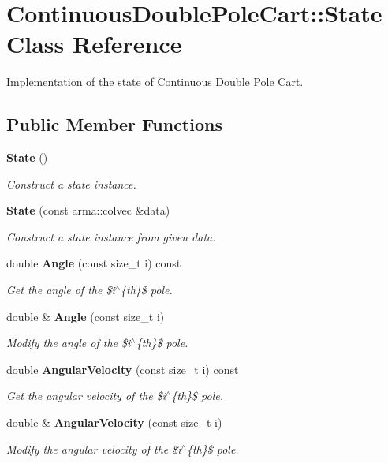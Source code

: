 \section{Continuous\+Double\+Pole\+Cart\+:\+:State Class Reference}
\label{classmlpack_1_1rl_1_1ContinuousDoublePoleCart_1_1State}


Implementation of the state of Continuous Double Pole Cart.  


\subsection*{Public Member Functions}
\begin{DoxyCompactItemize}
\item 
\textbf{ State} ()
\begin{DoxyCompactList}\small\item\em Construct a state instance. \end{DoxyCompactList}\item 
\textbf{ State} (const arma\+::colvec \&data)
\begin{DoxyCompactList}\small\item\em Construct a state instance from given data. \end{DoxyCompactList}\item 
double \textbf{ Angle} (const size\+\_\+t i) const
\begin{DoxyCompactList}\small\item\em Get the angle of the \$i$^\wedge$\{th\}\$ pole. \end{DoxyCompactList}\item 
double \& \textbf{ Angle} (const size\+\_\+t i)
\begin{DoxyCompactList}\small\item\em Modify the angle of the \$i$^\wedge$\{th\}\$ pole. \end{DoxyCompactList}\item 
double \textbf{ Angular\+Velocity} (const size\+\_\+t i) const
\begin{DoxyCompactList}\small\item\em Get the angular velocity of the \$i$^\wedge$\{th\}\$ pole. \end{DoxyCompactList}\item 
double \& \textbf{ Angular\+Velocity} (const size\+\_\+t i)
\begin{DoxyCompactList}\small\item\em Modify the angular velocity of the \$i$^\wedge$\{th\}\$ pole. \end{DoxyCompactList}\item 

\end{DoxyCompactItemize}
